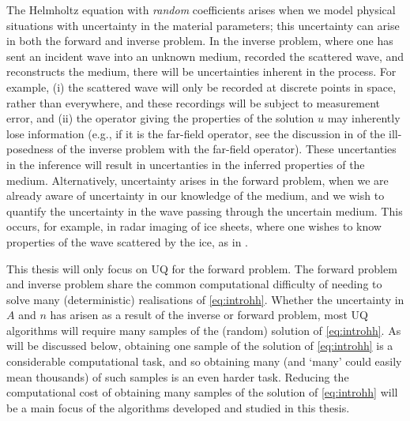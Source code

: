 The Helmholtz equation with \emph{random} coefficients arises when we model physical situations with uncertainty in the material parameters; this uncertainty can arise in both the forward and inverse problem. In the inverse problem, where one has sent an incident wave into an unknown medium, recorded the scattered wave, and reconstructs the medium, there will be uncertainties inherent in the process. For example, (i) the scattered wave will only be recorded at discrete points in space, rather than everywhere, and these recordings will be subject to measurement error, and (ii) the operator giving the properties of the solution $u$ may inherently lose information (e.g., if it is the far-field operator, see the discussion in \cite[pp. 37--38]{CoKr:13} of the ill-posedness of the inverse problem with the far-field operator).  These uncertanties in the inference will result in uncertanties in the inferred properties of the medium. Alternatively, uncertainty arises in the forward problem, when we are already aware of uncertainty in our knowledge of the medium, and we wish to quantify the uncertainty in the wave passing through the uncertain medium. This occurs, for example, in radar imaging of ice sheets, where one wishes to know properties of the wave scattered by the ice, as in \cite{JiPi:18}.

This thesis will only focus on UQ for the forward problem. The forward problem and inverse problem share the common computational difficulty of needing to solve many (deterministic) realisations of \eqref{eq:introhh}. Whether the uncertainty in $A$ and $n$ has arisen as a result of the inverse or forward problem, most UQ algorithms will require many samples of the (random) solution of \eqref{eq:introhh}. As will be discussed below, obtaining one sample of the solution of \eqref{eq:introhh} is a considerable computational task, and so obtaining many (and `many' could easily mean thousands) of such samples is an even harder task. Reducing the computational cost of obtaining many samples of the solution of \eqref{eq:introhh} will be a main focus of the algorithms developed and studied in this thesis.%


